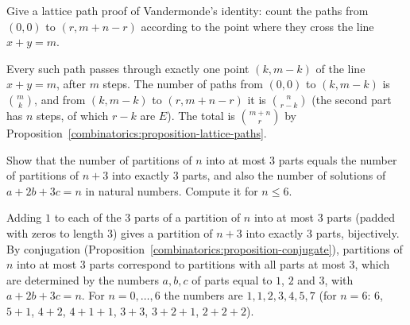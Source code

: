 \begin{exercise}\label{combinatorics:exercise-vandermonde-paths}
Give a lattice path proof of Vandermonde's identity: count the paths from $(0, 0)$ to $(r, m + n - r)$ according to the point where they cross the line $x + y = m$.
\end{exercise}

\begin{solution}
Every such path passes through exactly one point $(k, m - k)$ of the line $x + y = m$, after $m$ steps. The number of paths from $(0, 0)$ to $(k, m - k)$ is $\binom{m}{k}$, and from $(k, m - k)$ to
$(r, m + n - r)$ it is $\binom{n}{r - k}$ (the second part has $n$ steps, of which $r - k$ are $E$). The total is $\binom{m + n}{r}$ by Proposition~\ref{combinatorics:proposition-lattice-paths}.
\end{solution}

\begin{exercise}\label{combinatorics:exercise-partitions-three-parts}
Show that the number of partitions of $n$ into at most $3$ parts equals the number of partitions of $n + 3$ into exactly $3$ parts, and also the number of solutions of $a + 2b + 3c = n$ in natural
numbers. Compute it for $n \leq 6$.
\end{exercise}

\begin{solution}
Adding $1$ to each of the $3$ parts of a partition of $n$ into at most $3$ parts (padded with zeros to length $3$) gives a partition of $n + 3$ into exactly $3$ parts, bijectively. By conjugation (Proposition~\ref{combinatorics:proposition-conjugate}), partitions of $n$
into at most $3$ parts correspond to partitions with all parts at most $3$, which are determined by the numbers $a, b, c$ of parts equal to $1$, $2$ and $3$, with $a + 2b + 3c = n$. For $n = 0, \ldots, 6$ the numbers are $1, 1, 2, 3, 4, 5, 7$ (for $n = 6$:
$6$, $5 + 1$, $4 + 2$, $4 + 1 + 1$, $3 + 3$, $3 + 2 + 1$, $2 + 2 + 2$).
\end{solution}
